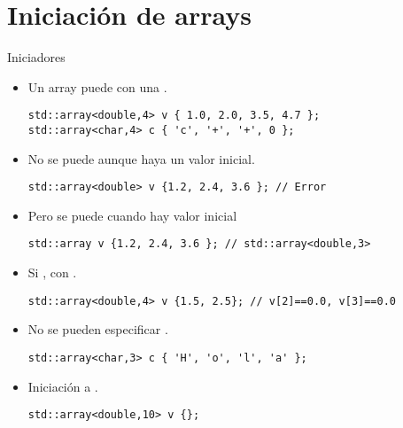 \section{Iniciación de arrays}

\begin{frame}[t,fragile]{Iniciadores}
\begin{itemize}
  \item Un array puede  con una .
\begin{lstlisting}
std::array<double,4> v { 1.0, 2.0, 3.5, 4.7 };
std::array<char,4> c { 'c', '+', '+', 0 };
\end{lstlisting}

  \item No se puede  aunque haya un valor inicial.
\begin{lstlisting}
std::array<double> v {1.2, 2.4, 3.6 }; // Error
\end{lstlisting}

  \item Pero se puede  cuando hay valor inicial
\begin{lstlisting}
std::array v {1.2, 2.4, 3.6 }; // std::array<double,3>
\end{lstlisting}

  \item Si ,  con .
\begin{lstlisting}
std::array<double,4> v {1.5, 2.5}; // v[2]==0.0, v[3]==0.0
\end{lstlisting}

  \item No se pueden especificar .
\begin{lstlisting}
std::array<char,3> c { 'H', 'o', 'l', 'a' };
\end{lstlisting}

  \item Iniciación a .
\begin{lstlisting}
std::array<double,10> v {};
\end{lstlisting}
\end{itemize}
\end{frame}


